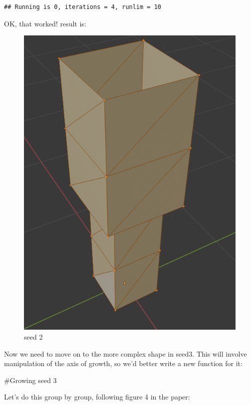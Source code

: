 \documentclass[]{article}
\begin{document}
\begin{verbatim}
## Running is 0, iterations = 4, runlim = 10
\end{verbatim}

OK, that worked! result is:

\begin{figure}
\centering
\includegraphics{seed2.png}
\caption{seed 2}
\end{figure}

Now we need to move on to the more complex shape in seed3. This will
involve manipulation of the axis of growth, so we'd better write a new
function for it:

\#Growing seed 3

Let's do this group by group, following figure 4 in the paper:
\end{document}
